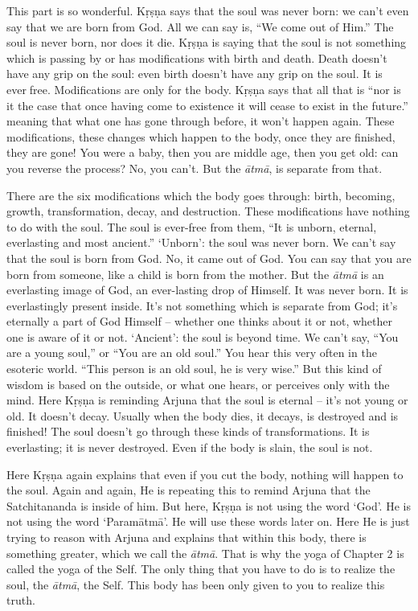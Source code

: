 This part is so wonderful. Kṛṣṇa says that the soul was never born: we can’t even say that we are born from God. All we can say is, “We come out of Him.” The soul is never born, nor does it die. Kṛṣṇa is saying that the soul is not something which is passing by or has modifications with birth and death. Death doesn’t have any grip on the soul: even birth doesn’t have any grip on the soul. It is everfree. Modifications are only for the body. Kṛṣṇa says that all that is “nor is it the case that once having come to existence it will cease to exist in the future.” meaning that what one has gone through before, it won’t happen again. These modifications, these changes which happen to the body, once they are finished, they are gone! You were a baby, then you are middle age, then you get old: can you reverse the process? No, you can’t. But the \textit{ātmā}, is separate from that.

There are the six modifications which the body goes through: birth, becoming, growth, transformation, decay, and destruction. These modifications have nothing to do with the soul. The soul is ever-free from them, “It is unborn, eternal, everlasting and most ancient.” ‘Unborn’: the soul was never born. We can’t say that the soul is born from God. No, it came out of God. You can say that you are born from someone, like a child is born from the mother. But the \textit{ātmā} is an everlasting image of God, an ever-lasting drop of Himself. It was never born. It is everlastingly present inside. It’s not something which is separate from God; it’s eternally a part of God Himself – whether one thinks about it or not, whether one is aware of it or not. ‘Ancient’: the soul is beyond time. We can’t say, “You are a young soul,” or “You are an old soul.” You hear this very often in the esoteric world. “This person is an old soul, he is very wise.” But this kind of wisdom is based on the outside, or what one hears, or perceives only with the mind. Here Kṛṣṇa is reminding Arjuna that the soul is eternal – it’s not young or old. It doesn’t decay. Usually when the body dies, it decays, is destroyed and is finished! The soul doesn’t go through these kinds of transformations. It is everlasting; it is never destroyed. Even if the body is slain, the soul is not.

Here Kṛṣṇa again explains that even if you cut the body, nothing will happen to the soul. Again and again, He is repeating this to remind Arjuna that the Satchitananda is inside of him. But here, Kṛṣṇa is not using the word ‘God’. He is not using the word ‘Paramātmā’. He will use these words later on. Here He is just trying to reason with Arjuna and explains that within this body, there is something greater, which we call the \textit{ātmā}. That is why the yoga of Chapter 2 is called the yoga of the Self. The only thing that you have to do is to realize the soul, the \textit{ātmā}, the Self. This body has been only given to you to realize this truth.

